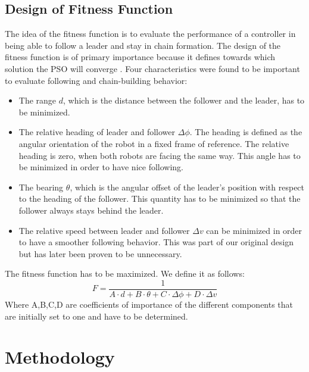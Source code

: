 \documentclass[a4paper, 10pt, conference]{ieeeconf}      %
\begin{document}
\subsection{Design of Fitness Function}
The idea of the fitness function is to evaluate the performance of a controller in being able to follow a leader and stay in chain formation. The design of the fitness function is of primary importance because it defines towards which solution the PSO will converge \cite{c2}. Four characteristics were found to be important to evaluate following and chain-building behavior:
\begin{itemize}
\item The range $d$, which is the distance between the follower and the leader, has to be minimized.
\item The relative heading of leader and follower $\Delta \phi $. The heading is defined as the angular orientation of the robot in a fixed frame of reference. The relative heading is zero, when both robots are facing the same way. This angle has to be minimized in order to have nice following. 
\item The bearing $\theta $, which is the angular offset of the leader's position with respect to the heading of the follower. This quantity has to be minimized so that the follower always stays behind the leader.
\item The relative speed between leader and follower $\Delta v $ can be minimized in order to have a smoother following behavior. This was part of our original design but has later been proven to be unnecessary.
\end{itemize}
The fitness function has to be maximized. We define it as follows:
\begin{equation}\label{fitness}
F=\frac{1}{A \cdot d+B \cdot \theta+C \cdot \Delta \phi+D \cdot \Delta v}
\end{equation}
Where A,B,C,D are coefficients of importance of the different components that are initially set to one and have to be determined.

\section{Methodology}

\end{document}
